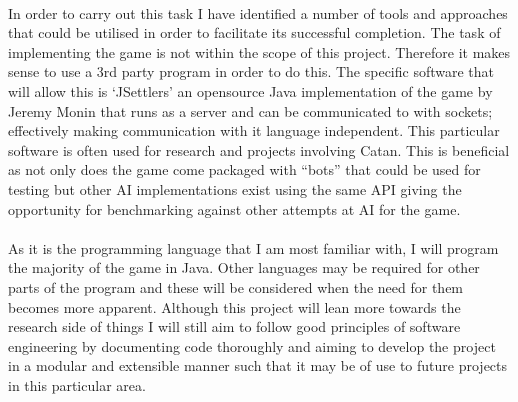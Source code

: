 \documentclass[]{article}
\begin{document}
\paragraph{}
In order to carry out this task I have identified a number of tools and approaches that could be utilised in order to facilitate its successful completion. The task of implementing the game is not within the scope of this project. Therefore it makes sense to use a 3rd party program in order to do this. The specific software that will allow this is `JSettlers' an opensource Java implementation of the game by Jeremy Monin that runs as a server and can be communicated to with sockets; effectively making communication with it language independent. This particular software is often used for research and projects involving Catan. This is beneficial as not only does the game come packaged with ``bots'' that could be used for testing but other AI implementations exist using the same API giving the opportunity for benchmarking against other attempts at AI for the game.

\paragraph{}
As it is the programming language that I am most familiar with, I will program the majority of the game in Java. Other languages may be required for other parts of the program and these will be considered when the need for them becomes more apparent. Although this project will lean more towards the research side of things I will still aim to follow good principles of software engineering by documenting code thoroughly and aiming to develop the project in a modular and extensible manner such that it may be of use to future projects in this particular area. 
\end{document}
